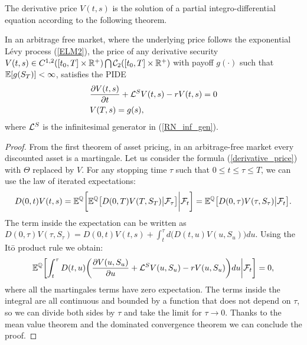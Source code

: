 The derivative price $V(t,s)$ is the solution of a partial integro-differential equation according to the following theorem.
\begin{Theorem}
 In an arbitrage free market, where the underlying price follows the exponential Lévy process (\ref{ELM2}), 
 the price of any derivative security $V(t,s) \in C^{1,2}([t_0,T] \times \mathbb{R}^+) \bigcap \mathcal{C}_2([t_0,T] \times \mathbb{R}^+)$ 
 with payoff $g(\cdot)$ such that $\mathbb{E}[g(S_T)]< \infty$, satisfies the PIDE
\begin{align}\label{derivative_PIDE}
 & \frac{\partial V(t,s)}{\partial t} + \mathcal{L}^{S} V(t,s) -r V(t,s) = 0 \\
 & V(T,s) = g(s),
\end{align}
where $\mathcal{L}^S$ is the infinitesimal generator in (\ref{RN_inf_gen}). 
\end{Theorem}
\begin{proof}
 From the first theorem of asset pricing, in an arbitrage-free market every discounted asset is a martingale. 
 Let us consider the formula 
 (\ref{derivative_price}) with $\varTheta$ replaced by $V$. For any stopping time $\tau$ such that $0 \leq t \leq \tau \leq T$, we can use the law of iterated expectations:
 $$ D(0,t) V(t,s) = \mathbb{E}^{\mathbb{Q}}  \biggl[ \mathbb{E}^{\mathbb{Q}} \bigl[ D(0,T) V(T,S_T) \big| \mathcal{F}_{\tau} \bigr] \bigg| \mathcal{F}_t \biggr] = \mathbb{E}^{\mathbb{Q}} \bigl[ D(0,\tau) V(\tau,S_{\tau}) \big| \mathcal{F}_t \bigr]. $$
 The term inside the expectation can be written as $D(0,\tau) V(\tau,S_{\tau}) = D(0,t) V(t,s) + \int_t^{\tau} d\bigl(D(t,u) V(u,S_u)\bigr) du$. Using the It\=o product rule we obtain:
 $$ \mathbb{E}^{\mathbb{Q}} \biggl[ \int_t^{\tau} D(t,u) \biggl( \frac{\partial V(u,S_u)}{\partial u} + \mathcal{L}^{S} V(u,S_u) -r V(u,S_u) \biggr) du \bigg| \mathcal{F}_t \biggr] = 0, $$
 where all the martingales terms have zero expectation. The terms inside the integral are all continuous and bounded by a function that does not depend on $\tau$, 
 so we can divide both sides by $\tau$ and take the limit for 
 $\tau \to 0$. Thanks to the mean value theorem and the dominated convergence theorem we can conclude the proof.
\end{proof}


